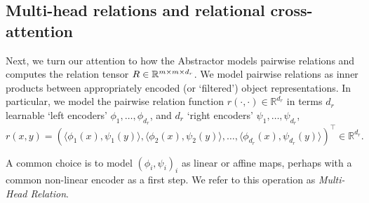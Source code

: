 %
%
%
%
%



\subsection{Multi-head relations and relational cross-attention}

Next, we turn our attention to how the Abstractor models pairwise relations and computes the relation tensor $R \in \mathbb{R}^{m \times m \times d_r}$. We model pairwise relations as inner products between appropriately encoded (or `filtered') object representations. In particular, we model the pairwise relation function $r(\cdot, \cdot) \in \mathbb{R}^{d_r}$ in terms $d_r$ learnable `left encoders' $\phi_1, \ldots, \phi_{d_r}$, and $d_r$ `right encoders' $\psi_1, \ldots, \psi_{d_r}$,
\begin{equation}\label{eq:multi_head_rel}
    r(x,y) = \left(\langle \phi_1(x), \psi_1(y) \rangle, \langle \phi_2(x), \psi_2(y) \rangle, \ldots, \langle \phi_{d_r}(x), \psi_{d_r}(y) \rangle \right)^\top \in \mathbb{R}^{d_r}.
\end{equation}

A common choice is to model $(\phi_i, \psi_i)_i$ as linear or affine maps, perhaps with a common non-linear encoder as a first step. We refer to this operation as \textit{Multi-Head Relation}.

